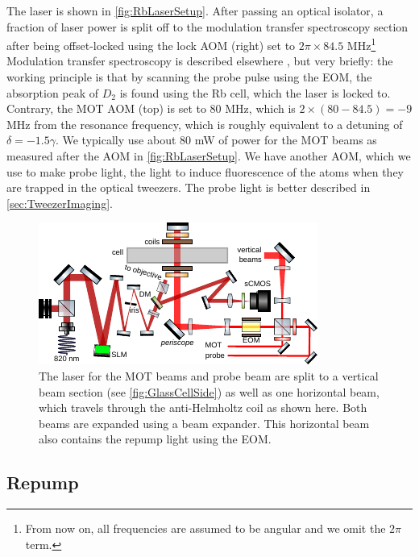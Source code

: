 The laser is shown in \cref{fig:RbLaserSetup}.
After passing an optical isolator, a fraction of laser power is split off to the modulation transfer spectroscopy section after being offset-locked using the lock \ac{AOM} (right) set to $2\pi \times  84.5$ MHz\footnote{From now on, all frequencies are assumed to be angular and we omit the $2\pi$ term.}
Modulation transfer spectroscopy is described elsewhere \cite{McCarron2008,Reijnders2010}, but very briefly: the working principle is that by scanning the probe pulse using the \ac{EOM}, the absorption peak of $D_2$ is found using the Rb cell, which the laser is locked to.  
Contrary, the MOT AOM (top) is set to 80 MHz, which is $2 \times (80 - 84.5) = -9$ MHz from the resonance frequency, which is roughly equivalent to a detuning of $\delta = -1.5 \gamma$.
We typically use about $80$ mW of power for the MOT beams as measured after the \ac{AOM} in \cref{fig:RbLaserSetup}.
We have another AOM, which we use to make probe light, the light to induce fluorescence of the atoms when they are trapped in the optical tweezers.
The probe light is better described in \cref{sec:TweezerImaging}.

\begin{figure}[t]
    \centering
    \includegraphics[width=\textwidth]{figures/MOTupview.pdf}
    \caption{The laser for the MOT beams and probe beam are split to a vertical beam section (see \cref{fig:GlassCellSide}) as well as one horizontal beam, which travels through the anti-Helmholtz coil as shown here. 
    Both beams are expanded using a beam expander.
    This horizontal beam also contains the repump light using the \ac{EOM}.
    }
    \label{fig:GlassCellTop}
\end{figure}

\subsection{Repump}

